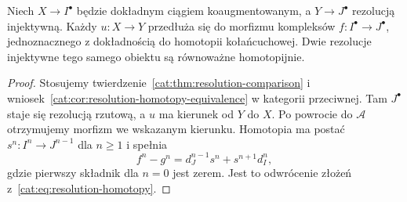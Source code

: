 \begin{wniosek}\label{cat:cor:injective-comparison}
Niech $X\to I^\bullet$ będzie dokładnym ciągiem koaugmentowanym, a $Y\to J^\bullet$ rezolucją injektywną. Każdy $u:X\to Y$ przedłuża się do morfizmu kompleksów $f:I^\bullet\to J^\bullet$, jednoznacznego z dokładnością do homotopii kołańcuchowej. Dwie rezolucje injektywne tego samego obiektu są równoważne homotopijnie.
\end{wniosek}
\begin{proof}
Stosujemy twierdzenie~\ref{cat:thm:resolution-comparison} i wniosek~\ref{cat:cor:resolution-homotopy-equivalence} w kategorii przeciwnej. Tam $J^\bullet$ staje się rezolucją rzutową, a $u$ ma kierunek od $Y$ do $X$. Po powrocie do $\mathcal A$ otrzymujemy morfizm we wskazanym kierunku. Homotopia ma postać $s^n:I^n\to J^{n-1}$ dla $n\ge1$ i spełnia
\[
 f^n-g^n=d_J^{n-1}s^n+s^{n+1}d_I^n,
\]
gdzie pierwszy składnik dla $n=0$ jest zerem. Jest to odwrócenie złożeń z~\eqref{cat:eq:resolution-homotopy}.
\end{proof}

